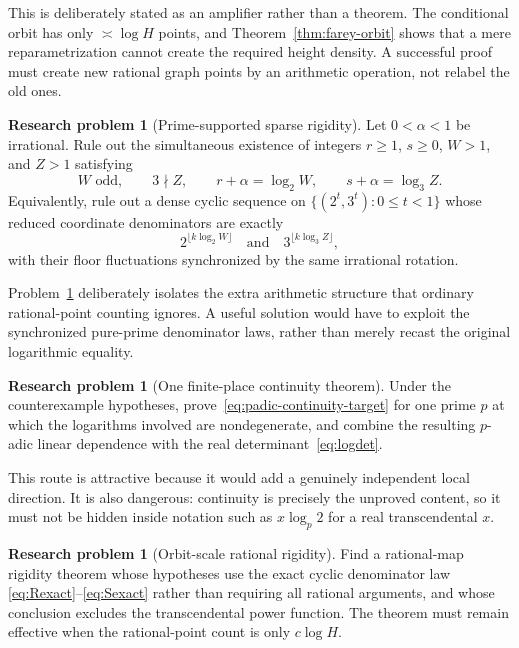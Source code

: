 \documentclass[11pt]{article}
\theoremstyle{definition}
\newtheorem{problem}[theorem]{Research problem}
\theoremstyle{remark}
\begin{document}
This is deliberately stated as an amplifier rather than a theorem.  The conditional orbit
has only $\asymp\log H$ points, and Theorem~\ref{thm:farey-orbit} shows that a mere
reparametrization cannot create the required height density.  A successful proof must create
new rational graph points by an arithmetic operation, not relabel the old ones.

\begin{problem}[Prime-supported sparse rigidity]\label{prob:sparse-rigidity}
Let $0<\alpha<1$ be irrational.  Rule out the simultaneous existence of integers
$r\ge1$, $s\ge0$, $W>1$, and $Z>1$ satisfying
\[
 W\text{ odd},\qquad 3\nmid Z,
 \qquad r+\alpha=\log_2W,
 \qquad s+\alpha=\log_3Z.
\]
Equivalently, rule out a dense cyclic sequence on
$\{(2^t,3^t):0\le t<1\}$ whose reduced coordinate denominators are exactly
\[
 2^{\lfloor k\log_2W\rfloor}
 \quad\text{and}\quad
 3^{\lfloor k\log_3Z\rfloor},
\]
with their floor fluctuations synchronized by the same irrational rotation.
\end{problem}

Problem~\ref{prob:sparse-rigidity} deliberately isolates the extra arithmetic structure that
ordinary rational-point counting ignores.  A useful solution would have to exploit the
synchronized pure-prime denominator laws, rather than merely recast the original logarithmic
equality.

\begin{problem}[One finite-place continuity theorem]\label{prob:padic}
Under the counterexample hypotheses, prove~\eqref{eq:padic-continuity-target} for one prime
$p$ at which the logarithms involved are nondegenerate, and combine the resulting $p$-adic
linear dependence with the real determinant~\eqref{eq:logdet}.
\end{problem}

This route is attractive because it would add a genuinely independent local direction.  It
is also dangerous: continuity is precisely the unproved content, so it must not be hidden
inside notation such as $x\log_p2$ for a real transcendental $x$.

\begin{problem}[Orbit-scale rational rigidity]\label{prob:orbit-rigidity}
Find a rational-map rigidity theorem whose hypotheses use the exact cyclic denominator law
\eqref{eq:Rexact}--\eqref{eq:Sexact} rather than requiring all rational arguments, and whose
conclusion excludes the transcendental power function.  The theorem must remain effective
when the rational-point count is only $c\log H$.
\end{problem}
\end{document}
